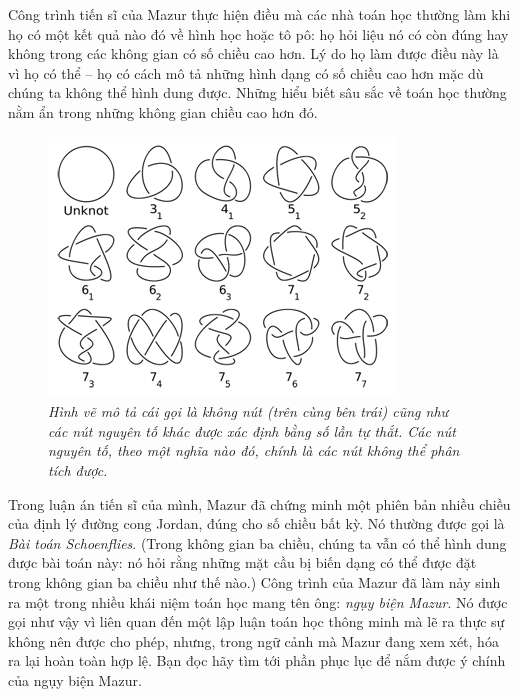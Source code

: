 \begin{multicols}{2}
	\vskip 0.05cm
	Công trình tiến sĩ của Mazur thực hiện điều mà các nhà toán học thường làm khi họ có một kết quả nào đó về hình học hoặc tô pô: họ hỏi liệu nó có còn đúng hay không trong các không gian có số chiều cao hơn. Lý do họ làm được điều này là vì họ có thể -- họ có cách mô tả những hình dạng có số chiều cao hơn mặc dù chúng ta không thể hình dung được. Những hiểu biết sâu sắc về toán học thường nằm ẩn trong những không gian chiều cao hơn đó.
	\begin{figure}[H]
		\centering
		\vspace*{-5pt}
		\captionsetup{labelformat= empty, justification=centering}
		\includegraphics[width=0.85\linewidth]{2}
		\caption{\small\textit{\color{duongvaotoanhoc}Hình vẽ  mô tả cái gọi là không nút  (trên cùng bên trái) cũng như các nút nguyên tố khác được xác định bằng số lần tự thắt. Các nút nguyên tố, theo một nghĩa nào đó, chính là các nút không thể phân tích được.}}
		\vspace*{-10pt}
	\end{figure}
	Trong luận án tiến sĩ của mình, Mazur đã chứng minh một phiên bản nhiều chiều của định lý đường cong Jordan, đúng cho số chiều bất kỳ. Nó thường được gọi là \textit{Bài toán Schoenflies}. (Trong không gian ba chiều, chúng ta vẫn có thể hình dung được bài toán này: nó hỏi rằng những mặt cầu bị biến dạng có thể được đặt trong không gian ba chiều như thế nào.)
	\vskip 0.05cm
	Công trình của Mazur đã làm nảy sinh ra một trong nhiều khái niệm toán học  mang tên ông: \textit{ngụy biện Mazur}. Nó được gọi như vậy vì liên quan đến một lập luận toán học thông minh mà lẽ ra thực sự không nên được cho phép, nhưng, trong ngữ cảnh mà Mazur đang xem xét, hóa ra lại hoàn toàn hợp lệ. Bạn đọc hãy tìm tới phần phục lục để nắm được ý chính của ngụy biện Mazur.

\end{multicols}
